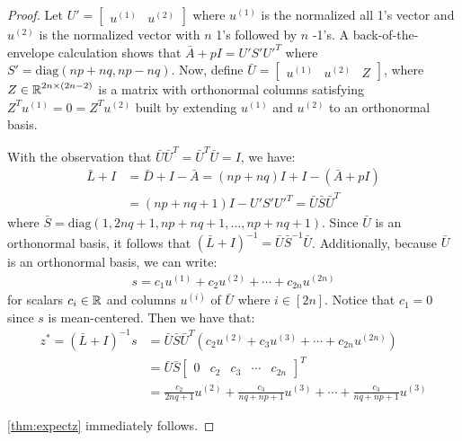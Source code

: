 \begin{proof}
Let $U' = \begin{bmatrix} u^{(1)} & u^{(2)} \end{bmatrix}$
where $u^{(1)}$
is the normalized all 1's vector and $u^{(2)}$
is the normalized vector with $n$ 1's followed
by $n$ -1's.
A back-of-the-envelope calculation shows that
$\bar{A} + p I=U'S'U'^T$
where $S' = \textrm{diag}(np+nq, np-nq)$.
Now, define $\bar{U} = \begin{bmatrix} u^{(1)} & u^{(2)} 
& Z \end{bmatrix}$,
where $Z \in \operatorname*{\mathbb{R}}^{2n \times (2n-2)}$ is a matrix
with orthonormal columns satisfying
$Z^T u^{(1)} = 0 = Z^T u^{(2)}$ built by
extending $u^{(1)}$ and $u^{(2)}$ to an orthonormal
basis.

With the observation that $\bar{U}\bar{U}^T
= \bar{U}^T \bar{U} = I$, we have:
\begin{align}\label{eq:decomposeLI}
    \bar{L}+I &= \bar{D} + I - \bar{A}
    = (np + nq)I + I - (\bar{A} + pI)
    \nonumber \\
    &= (np + nq + 1)I - U'S'U'^T
    = \bar{U}\bar{S}\bar{U}^T
\end{align}
where $\bar{S}=\textrm{diag}
(1, 2nq+1, np+nq+1, \ldots, np+nq+1)$.
Since $\bar{U}$ is an orthonormal basis, it follows that
$(\bar{L}+I)^{-1} = \bar{U}\bar{S}^{-1}\bar{U}$.
Additionally, because $\bar{U}$ is an orthonormal basis,
we can write: 
\begin{align}
    s = c_1 u^{(1)} + c_2 u^{(2)} 
    + \cdots + c_{2n} u^{(2n)}
    \nonumber
\end{align}
for scalars $c_i \in \operatorname*{\mathbb{R}}$
and columns $u^{(i)}$ of $\bar{U}$ 
where $i \in [2n]$.
Notice that $c_1 =0$ since $s$ is mean-centered.
Then we have that:
\begin{align}
    z^* = (\bar{L}+I)^{-1} s &= \bar{U}\bar{S}\bar{U}^T
    (c_2 u^{(2)} + c_3 u^{(3)} + \cdots + c_{2n} u^{(2n)})
    \nonumber \\
    &= \bar{U}\bar{S} \begin{bmatrix}
        0 & c_2 & c_3 & \cdots & c_{2n}
    \end{bmatrix}^T \nonumber \\
    &= \frac{c_2}{2nq + 1} u^{(2)}
    + \frac{c_3}{nq +np + 1} u^{(3)}
    + \cdots + \frac{c_3}{nq +np + 1}u^{(3)} \nonumber
\end{align}

\cref{thm:expectz} immediately follows.
\end{proof}


